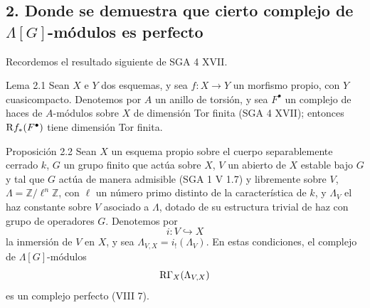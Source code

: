 \subsection*{2. Donde se demuestra que cierto complejo de $\Lambda[G]$-módulos es perfecto}

Recordemos el resultado siguiente de SGA 4 XVII.

\begin{statement}{Lema 2.1}
Sean $X$ e $Y$ dos esquemas, y sea $f:X\to Y$ un morfismo propio, con $Y$ cuasicompacto. Denotemos por $A$ un anillo de torsión, y sea $F^\bullet$ un complejo de haces de $A$-módulos sobre $X$ de dimensión Tor finita (SGA 4 XVII); entonces $\mathrm{R} f_*(F^\bullet)$ tiene dimensión Tor finita.
\end{statement}

\begin{statement}{Proposición 2.2}
Sean $X$ un esquema propio sobre el cuerpo separablemente cerrado $k$, $G$ un grupo finito que actúa sobre $X$, $V$ un abierto de $X$ estable bajo $G$ y tal que $G$ actúa de manera admisible (SGA 1 V 1.7) y libremente sobre $V$, $\Lambda=\mathbb Z/\ell^n\mathbb Z$, con $\ell$ un número primo distinto de la característica de $k$, y $\Lambda_V$ el haz constante sobre $V$ asociado a $\Lambda$, dotado de su estructura trivial de haz con grupo de operadores $G$. Denotemos por
\[
i:V\hookrightarrow X
\]
la inmersión de $V$ en $X$, y sea $\Lambda_{V,X}=i_!(\Lambda_V)$. En estas condiciones, el complejo de $\Lambda[G]$-módulos
\[
\mathrm{R}\Gamma_X(\Lambda_{V,X})
\]
es un complejo perfecto (VIII 7).
\end{statement}

